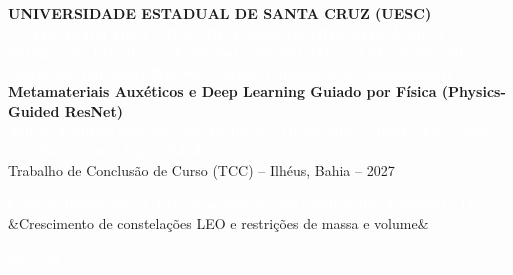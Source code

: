 \documentclass[11pt]{article}
\newcommand{\slideheader}[3]{
    \noindent
    \begin{minipage}{\textwidth}
        \colorbox{SpaceNavy}{
            \parbox{\dimexpr\textwidth-2\fboxsep\relax}{
                \vspace{0.2cm}
                \hspace{0.3cm}
                \begin{minipage}{0.85\textwidth}
                    {\Large \textbf{\textcolor{white}{#1}}}\\[0.1cm]
                    \ifx&#2&\else{\small \textbf{\textcolor{SpaceGold}{#2}}}\fi
                \end{minipage}
                \hfill
                \begin{minipage}{0.10\textwidth}
                    \raggedleft
                    {\large \textbf{\textcolor{white}{#3 / 20}}}\hspace{0.3cm}
                \end{minipage}
                \vspace{0.2cm}
            }
        }
    \end{minipage}
    \vspace{0.4cm}
}
\begin{document}
\noindent
\colorbox{SpaceNavy}{
    \parbox[c][12.2cm][c]{\dimexpr\textwidth-2\fboxsep\relax}{
        \centering
        \vspace{0.8cm}
        {\large \textbf{\textcolor{SpaceGold}{UNIVERSIDADE ESTADUAL DE SANTA CRUZ (UESC)}}}\\[0.2cm]
        {\small \textbf{\textcolor{white}{COLEGIADO DO CURSO DE ENGENHARIA MECÂNICA}}}\\[1.0cm]

        {\LARGE \textbf{\textcolor{white}{Otimização Estrutural de Chassi CubeSat 1U com Metamateriais}}}\\[0.3cm]
        {\Large \textbf{\textcolor{white}{Auxéticos em AlSi10Mg sob Cargas Dinâmicas de Lançamento}}}\\[0.6cm]

        {\large \textbf{\textcolor{SpaceGold}{Metamateriais Auxéticos e Deep Learning Guiado por Física (Physics-Guided ResNet)}}}\\[1.2cm]

        {\normalsize \textbf{\textcolor{white}{Autor: Gabriel Marques de Andrade \quad | \quad Orientadora: Prof.ª Dr.ª Nila Cecília de Faria Lopes Medeiros}}}\\[0.3cm]
        {\small \textcolor{gray!40}{Trabalho de Conclusão de Curso (TCC) -- Ilhéus, Bahia -- 2027}}
        \vspace{0.8cm}
    }
}
\clearpage

\slideheader{Contextualização: A Era New Space e os Limites dos CubeSats 1U}{Crescimento de constelações LEO e restrições de massa e volume}{02}
\end{document}
